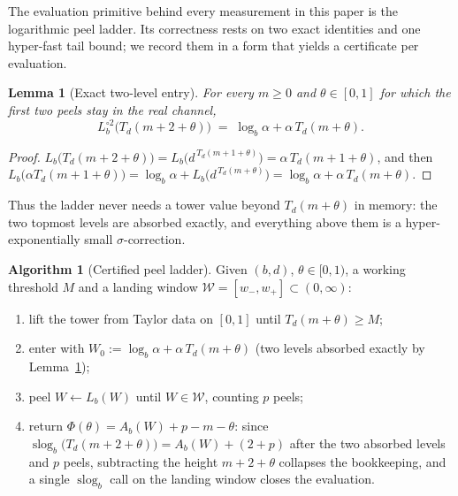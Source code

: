 \documentclass[11pt,a4paper]{article}
\newtheorem{lemma}[theorem]{Lemma}
\theoremstyle{definition}
\newtheorem{algorithm}[theorem]{Algorithm}
\theoremstyle{remark}
\newcommand{\slog}{\operatorname{slog}}
\begin{document}
The evaluation primitive behind every measurement in this paper is the logarithmic peel
ladder. Its correctness rests on two exact identities and one hyper-fast tail bound; we record
them in a form that yields a certificate per evaluation.

\begin{lemma}[Exact two-level entry]\label{lem:entry}
For every $m\ge 0$ and $\theta\in[0,1]$ for which the first two peels stay in the real
channel,
\begin{equation}\label{eq:entry}
L_b^{\circ 2}\bigl(T_d(m+2+\theta)\bigr)\;=\;\log_b\alpha+\alpha\,T_d(m+\theta).
\end{equation}
\end{lemma}

\begin{proof}
$L_b\bigl(T_d(m+2+\theta)\bigr)=L_b\bigl(d^{\,T_d(m+1+\theta)}\bigr)=\alpha\,T_d(m+1+\theta)$,
and then
$L_b\bigl(\alpha T_d(m+1+\theta)\bigr)=\log_b\alpha+L_b\bigl(d^{\,T_d(m+\theta)}\bigr)
=\log_b\alpha+\alpha\,T_d(m+\theta)$.
\end{proof}

Thus the ladder never needs a tower value beyond $T_d(m+\theta)$ in memory: the two topmost
levels are absorbed exactly, and everything above them is a hyper-exponentially small
$\sigma$-correction.

\begin{algorithm}[Certified peel ladder]\label{alg:ladder}
Given $(b,d)$, $\theta\in[0,1)$, a working threshold $M$ and a landing window
$\mathcal W=[w_-,w_+]\subset(0,\infty)$:
\begin{enumerate}
\item lift the tower from Taylor data on $[0,1]$ until $T_d(m+\theta)\ge M$;
\item enter with $W_0:=\log_b\alpha+\alpha\,T_d(m+\theta)$ (two levels absorbed exactly by
Lemma~\ref{lem:entry});
\item peel $W\leftarrow L_b(W)$ until $W\in\mathcal W$, counting $p$ peels;
\item return $\Phi(\theta)=A_b(W)+p-m-\theta$: since
$\slog_b\bigl(T_d(m+2+\theta)\bigr)=A_b(W)+(2+p)$ after the two absorbed levels and $p$
peels, subtracting the height $m+2+\theta$ collapses the bookkeeping, and a single
$\slog_b$ call on the landing window closes the evaluation.
\end{enumerate}
\end{algorithm}
\end{document}
